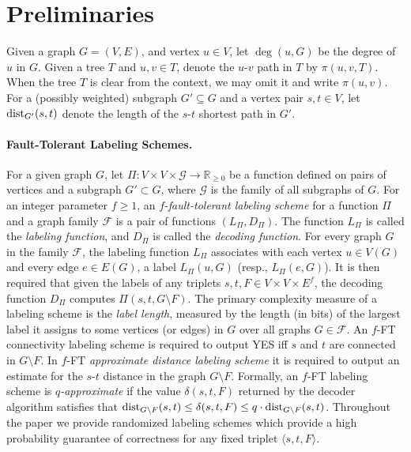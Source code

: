 \section{Preliminaries}
Given a graph $G=(V,E)$, and vertex $u \in V$, let $\deg(u,G)$ be the degree of $u$ in $G$. 
Given a tree $T$ and $u, v \in T$, denote the $u$-$v$ path in $T$ by $\pi(u,v,T)$. When the tree $T$ is clear from the context, we may omit it and write $\pi(u,v)$. For a (possibly weighted) subgraph $G' \subseteq G$ and a vertex pair $s,t \in V$, let $\mbox{\rm dist}_{G'}(s,t)$ denote the length of the $s$-$t$ shortest path in $G'$. 

\paragraph{Fault-Tolerant Labeling Schemes.}
For a given graph $G$, let $\Pi: V\times V \times \mathcal{G} \to \mathbb{R}_{\geq 0}$ %
be a function defined on pairs of vertices and a subgraph $G' \subset G$, where $\mathcal{G}$ is the family of all subgraphs of $G$. For an integer parameter $f\geq 1$, an $f$-\emph{fault-tolerant labeling scheme} for a function $\Pi$ and a graph family $\mathcal{F}$ is a pair of functions $(L_{\Pi},D_{\Pi})$. The function $L_{\Pi}$ is called the \emph{labeling function}, and $D_{\Pi}$ is called the \emph{decoding function}. For every graph $G$ in the family $\mathcal{F}$, the labeling function $L_{\Pi}$ associates with each vertex $u \in V(G)$ and every edge $e \in E(G)$, a label $L_{\Pi}(u,G)$ (resp., $L_{\Pi}(e,G)$). It is then required that given the labels of any triplets $s,t, F \in V \times V \times E^f$, the decoding function $D_{\Pi}$ computes $\Pi(s,t, G \setminus F)$.  The primary complexity measure of a labeling scheme is the \emph{label length}, measured by the length (in bits) of the largest label it assigns to some vertices (or edges) in $G$ over all graphs $G \in \mathcal{F}$. An $f$-FT connectivity labeling scheme is required to output YES iff $s$ and $t$ are connected in $G \setminus F$.  In $f$-FT \emph{approximate distance labeling scheme} it is required to output an estimate for the $s$-$t$ distance in the graph $G \setminus F$. Formally, an $f$-FT labeling scheme is $q$\emph{-approximate} if the value $\delta(s,t,F)$ returned by the decoder algorithm satisfies that $\mbox{\rm dist}_{G \setminus F}(s,t)\leq \delta(s,t,F) \leq q \cdot \mbox{\rm dist}_{G \setminus F}(s,t)$.  Throughout the paper we provide randomized labeling schemes which provide a high probability guarantee of correctness for any fixed triplet $\langle s,t, F \rangle$. 


